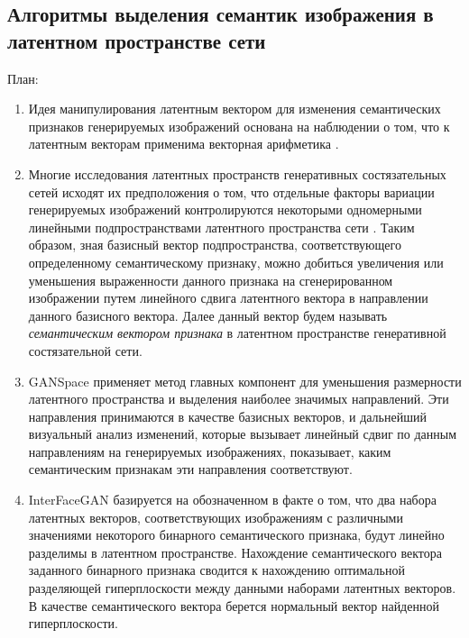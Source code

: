 \subsection{Алгоритмы выделения семантик изображения в латентном пространстве сети}

План:
\begin{enumerate}
\item 
Идея манипулирования латентным вектором для изменения семантических признаков генерируемых изображений основана на наблюдении о том, что к латентным векторам применима векторная арифметика \cite{radford2015unsupervised}.

\item
Многие исследования латентных пространств генеративных состязательных сетей исходят их предположения о том, что отдельные факторы вариации генерируемых изображений контролируются некоторыми одномерными линейными подпространствами латентного пространства сети \cite{StyleGAN}.
Таким образом, зная базисный вектор подпространства, соответствующего определенному семантическому признаку, можно добиться увеличения или уменьшения выраженности данного признака на сгенерированном изображении путем линейного сдвига латентного вектора в направлении данного базисного вектора. 
Далее данный вектор будем называть \emph{семантическим вектором признака} в латентном пространстве генеративной состязательной сети.

\item
%
GANSpace \cite{hrknen2020ganspace} применяет метод главных компонент для уменьшения размерности латентного пространства и выделения наиболее значимых направлений. Эти направления принимаются в качестве базисных векторов, и дальнейший визуальный анализ изменений, которые вызывает линейный сдвиг по данным направлениям на генерируемых изображениях, показывает, каким семантическим признакам эти направления соответствуют.

\item
%
InterFaceGAN \cite{shen2020interfacegan} базируется на обозначенном в \cite{StyleGAN} факте о том, что два набора латентных векторов, соответствующих изображениям с различными значениями некоторого бинарного семантического признака, будут линейно разделимы в латентном пространстве.
Нахождение семантического вектора заданного бинарного признака сводится к нахождению оптимальной разделяющей гиперплоскости между данными наборами латентных векторов.
В качестве семантического вектора берется нормальный вектор найденной гиперплоскости.
\end{enumerate}
